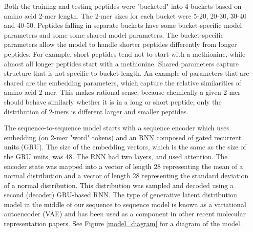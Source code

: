 \documentclass[final,1p,times,twocolumn]{elsarticle}
\begin{document}
Both the training and testing peptides were "bucketed" into 4 buckets based on amino acid 2-mer length. The 2-mer sizes for each bucket were 5-20, 20-30, 30-40 and 40-50. Peptides falling in separate buckets have some bucket-specific model parameters and some some shared model parameters. The bucket-specific parameters allow the model to handle shorter peptides differently from longer peptides. For example, short peptides tend not to start with a methionine, while almost all longer peptides start with a methionine. Shared parameters capture structure that is not specific to bucket length. An example of parameters that are shared are the embedding parameters, which capture the relative similarities of amino acid 2-mer. This makes rational sense, because chemically a given 2-mer should behave similarly whether it is in a long or short peptide, only the distribution of 2-mers is different larger and smaller peptides.

%
%

The sequence-to-sequence model starts with a sequence encoder which uses embedding (on 2-mer "word" tokens) and an RNN composed of gated recurrent units (GRU)\cite{chung2014empirical}. The size of the embedding vectors, which is the same as the size of the GRU units, was 48. The RNN had two layers, and used attention\cite{chorowski2014end}. The encoder state was mapped into a vector of length 28 representing the mean of a normal distribution and a vector of length 28 representing the standard deviation of a normal distribution. This distribution was sampled and decoded using a second (decoder) GRU-based RNN. The type of generative latent distribution model in the middle of our sequence to sequence model is known as a variational autoencoder (VAE) and has been used as a component in other recent molecular representation papers\cite{gomez2016automatic}. See Figure \ref{model_diagram} for a diagram of the model.
\end{document}
